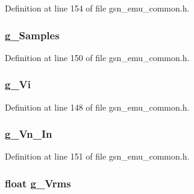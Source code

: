 Definition at line 154 of file gsn\_\-emu\_\-common.h.

\hypertarget{a00066_a763b2f9d5fadb50ff1bc8874f7724079}{
\subsubsection[{g\_\-Samples}]{ {\bf g\_\-Samples}}}
\label{a00066_a763b2f9d5fadb50ff1bc8874f7724079}


Definition at line 150 of file gsn\_\-emu\_\-common.h.

\hypertarget{a00066_a024d6e0967a6a806a277ed5debe22ed6}{
\subsubsection[{g\_\-Vi}]{ {\bf g\_\-Vi}}}
\label{a00066_a024d6e0967a6a806a277ed5debe22ed6}


Definition at line 148 of file gsn\_\-emu\_\-common.h.

\hypertarget{a00066_a16952e665654a8fad162e83becd272df}{
\subsubsection[{g\_\-Vn\_\-In}]{ {\bf g\_\-Vn\_\-In}}}
\label{a00066_a16952e665654a8fad162e83becd272df}


Definition at line 151 of file gsn\_\-emu\_\-common.h.

\hypertarget{a00066_ac96544d160851f9ac8132795c1f959e0}{
\subsubsection[{g\_\-Vrms}]{\setlength{\rightskip}{0pt plus 5cm}float {\bf g\_\-Vrms}}}
\label{a00066_ac96544d160851f9ac8132795c1f959e0}


